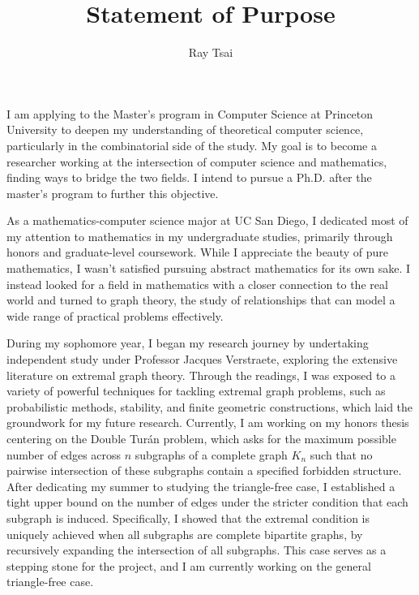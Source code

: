 \documentclass[12pt]{article}
\title{Statement of Purpose}
\author{Ray Tsai}
\date{}
\begin{document}
\maketitle

\vspace{-0.25in}

I am applying to the Master's program in Computer Science at Princeton University to deepen my
understanding of theoretical computer science, particularly in the combinatorial side of the study.
My goal is to become a researcher working at the intersection of computer science and mathematics,
finding ways to bridge the two fields. I intend to pursue a Ph.D. after the master's program to
further this objective.

As a mathematics-computer science major at UC San Diego, I dedicated most of my attention to
mathematics in my undergraduate studies, primarily through honors and graduate-level coursework.
While I appreciate the beauty of pure mathematics, I wasn't satisfied pursuing abstract mathematics
for its own sake. I instead looked for a field in mathematics with a closer connection to the real
world and turned to graph theory, the study of relationships that can model a wide range of
practical problems effectively.

During my sophomore year, I began my research journey by undertaking independent study under
Professor Jacques Verstraete, exploring the extensive literature on extremal graph theory. Through
the readings, I was exposed to a variety of powerful techniques for tackling extremal graph
problems, such as probabilistic methods, stability, and finite geometric constructions, which laid
the groundwork for my future research. Currently, I am working on my honors thesis centering on the
Double Turán problem, which asks for the maximum possible number of edges across $n$ subgraphs of a
complete graph $K_n$ such that no pairwise intersection of these subgraphs contain a specified
forbidden structure. After dedicating my summer to studying the triangle-free case, I established a
tight upper bound on the number of edges under the stricter condition that each subgraph is induced.
Specifically, I showed that the extremal condition is uniquely achieved when all subgraphs are
complete bipartite graphs, by recursively expanding the intersection of all subgraphs. This case
serves as a stepping stone for the project, and I am currently working on the general triangle-free
case. 
\end{document}
